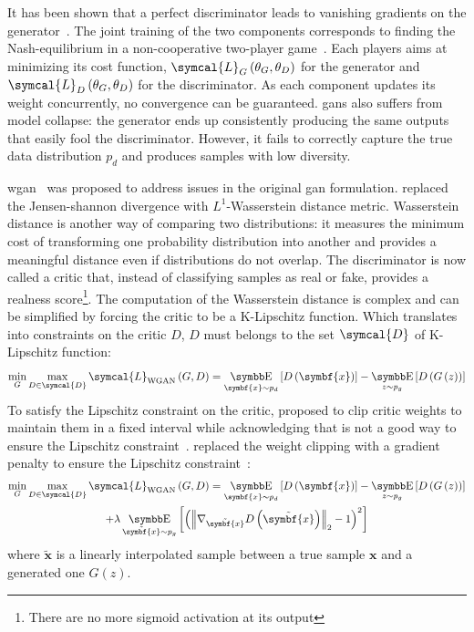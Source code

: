 \documentclass[../main.tex]{subfiles}
\begin{document}
		It has been shown that a perfect discriminator leads to vanishing gradients on the generator~\cite{Arjovsky2017TowardsPM}.
		The joint training of the two components corresponds to finding the Nash-equilibrium in a non-cooperative two-player game~\cite{Salimans2016ImprovedTF}.
		Each players aims at minimizing its cost function, \(\symcal{L}_{G}\left(\theta_{G}, \theta_{D}\right)\) for the generator and \(\symcal{L}_{D}\left(\theta_{G}, \theta_{D}\right)\) for the discriminator.
		As each component updates its weight concurrently, no convergence can be guaranteed.
		\Glspl{gan} also suffers from model collapse: the generator ends up consistently producing the same outputs that easily fool the discriminator.
		However, it fails to correctly capture the true data distribution \(p_{d}\) and produces samples with low diversity.

		\Gls{wgan}~\cite{WGAN} was proposed to address issues in the original \gls{gan} formulation.
		\citeauthor{WGAN} replaced the Jensen-shannon divergence with \(L^{1}\)-Wasserstein distance metric.
		Wasserstein distance is another way of comparing two distributions: it measures the minimum cost of transforming one probability distribution into another and provides a meaningful distance even if distributions do not overlap.
		The discriminator is now called a critic that, instead of classifying samples as real or fake, provides a realness score\footnote{There are no more sigmoid activation at its output}.
		The computation of the Wasserstein distance is complex and can be simplified by forcing the critic to be a K-Lipschitz function.
		Which translates into constraints on the critic \(D\), \(D\) must belongs to the set \( \symcal{D}\) of K-Lipschitz function:
		\begin{equation}
			\min_{G} \max_{D\in \symcal{D}} \symcal{L}_{\text{WGAN}}\left(G,D\right) = \E_{\symbf{x}\sim p_{d}}\left[ D\left(\symbf{x}\right)\right] - \E_{z\sim p_{g}}\left[ D\left(G\left(z\right)\right)\right] \label{eq:wgan_loss}
		\end{equation}
		To satisfy the Lipschitz constraint on the critic, \citeauthor{WGAN} proposed to clip critic weights to maintain them in a fixed interval while acknowledging that is not a good way to ensure the Lipschitz constraint~\cite{WGAN}.
		\citeauthor{WGANGP} replaced the weight clipping with a gradient penalty to ensure the Lipschitz constraint~\cite{WGANGP}:
		\begin{multline}
			\min_{G} \max_{D\in \symcal{D}} \symcal{L}_{\text{WGAN}}\left(G,D\right) = \E_{\symbf{x}\sim p_{d}}\left[ D\left(\symbf{x}\right)\right] - \E_{z\sim p_{g}}\left[ D\left(G\left(z\right)\right)\right] \\ + \lambda \E_{\tilde{\symbf{x}}\sim p_{g}}\left[ {\left( {\left\|\nabla_{\tilde{\symbf{x}}}D\left(\tilde{\symbf{x}}\right) \right\|}_{2} -1 \right)}^{2}\right]  \label{eq:wgangp_loss}
		\end{multline}
		where \(\tilde{\symbf{x}}\) is a linearly interpolated sample between a true sample \(\symbf{x}\) and a generated one \(G\left(z\right)\).
\end{document}

